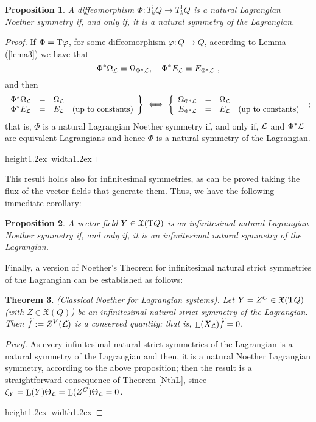 \documentclass[12pt]{report}
\newtheorem{teor}{Theorem}[chapter]
\newtheorem{prop}[teor]{Proposition}
\def\qed{\ifvmode\removelastskip\fi
{\unskip\nobreak\hfil\penalty50\hbox{}\nobreak\hfil
\hbox{\vrule height1.2ex width1.2ex}\parfillskip=0pt
\finalhyphendemerits=0 \par\smallskip}}
\def\vf{\mathfrak X}
\def\Lag{{\cal L}}
\def\Tan{{\rm T}}
\def\Lie{\mathop{\rm L}\nolimits}
\begin{document}
\begin{prop}
A diffeomorphism $\Phi\colon T^1_kQ\to T^1_kQ$ is a natural Lagrangian Noether symmetry
if, and only if, it is a natural symmetry of the Lagrangian.
\end{prop}
\begin{proof}
If $\Phi=\Tan\varphi$, for some diffeomorphism $\varphi\colon Q\to Q$,
according to Lemma (\ref{lema3}) we have that
$$
\Phi^*\Omega_\Lag=\Omega_{\Phi^*\Lag} ,\quad
\Phi^*E_\Lag=E_{\Phi^*\Lag} \ ,
$$
and then
$$
\left. \begin{array}{cccc}
\Phi^*\Omega_\Lag&=&\Omega_\Lag &  \\
\Phi^*E_\Lag&=&E_\Lag &  \mbox{\rm (up to constants)}
\end{array}\right\}
\ \Longleftrightarrow \
\left\{ \begin{array}{cccc}
\Omega_{\Phi^*\Lag}&=&\Omega_\Lag & \\
E_{\Phi^*\Lag}&=&E_\Lag &  \mbox{\rm (up to constants)}
\end{array}\right. \ ;
$$
that is, $\Phi$ is a natural Lagrangian Noether symmetry
if, and only if, $\Lag$ and $\Phi^*\Lag$ are equivalent Lagrangians and hence
$\Phi$ is a natural symmetry of the Lagrangian.
 \\ \qed \end{proof}

This result holds also for  infinitesimal symmetries,
as can be proved taking the flux of  the vector fields that generate them.
Thus, we have the following immediate corollary:

\begin{prop}
A vector field $Y\in\vf (\Tan Q)$ is an infinitesimal natural Lagrangian Noether symmetry
if, and only if, it is an infinitesimal natural symmetry of the Lagrangian.
\end{prop}

Finally, a version of Noether's Theorem
for infinitesimal natural strict symmetries of the Lagrangian can be established as follows:

\begin{teor}
 {\rm (Classical Noether for Lagrangian systems}).
Let  $Y=Z^C\in\vf (\Tan Q)$  (with $Z\in\vf(Q)$)
be an infinitesimal natural strict symmetry of the Lagrangian.
Then $\widetilde  f:=Z^V(\Lag)$ is a conserved quantity; that is, $\Lie (X_\Lag)\widetilde  f=0$.
 \label{NthLs}
\end{teor}
\begin{proof}
As every infinitesimal natural strict symmetries of the Lagrangian
is a natural symmetry of the Lagrangian and then,
it is a natural Noether Lagrangian symmetry, according to the above proposition;
then the result is a straightforward consequence of Theorem \ref{NthL},
since $\zeta_Y=\Lie(Y)\Theta_\Lag=\Lie(Z^C)\Theta_\Lag=0$.
\\ \qed \end{proof}
\end{document}
